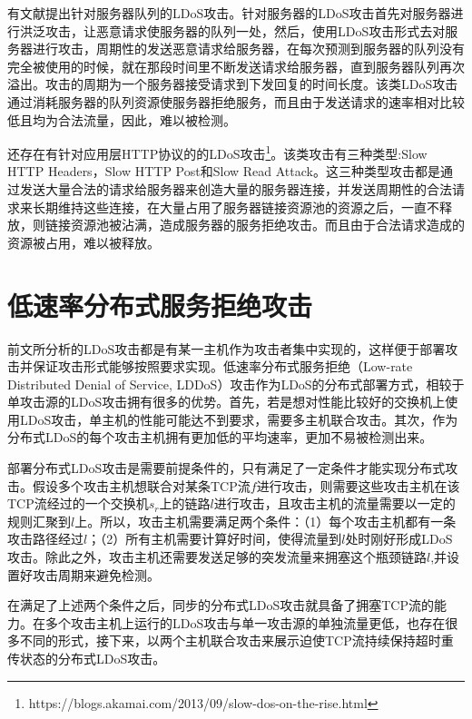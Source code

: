 有文献\cite{Maci2007Evaluation}提出针对服务器队列的LDoS攻击。针对服务器的LDoS攻击首先对服务器进行洪泛攻击，让恶意请求使服务器的队列一处，然后，使用LDoS攻击形式去对服务器进行攻击，周期性的发送恶意请求给服务器，在每次预测到服务器的队列没有完全被使用的时候，就在那段时间里不断发送请求给服务器，直到服务器队列再次溢出。攻击的周期为一个服务器接受请求到下发回复的时间长度。该类LDoS攻击通过消耗服务器的队列资源使服务器拒绝服务，而且由于发送请求的速率相对比较低且均为合法流量，因此，难以被检测。

还存在有针对应用层HTTP协议的的LDoS攻击\footnote{https://blogs.akamai.com/2013/09/slow-dos-on-the-rise.html}。该类攻击有三种类型:Slow HTTP Headers，Slow HTTP Post和Slow Read Attack。这三种类型攻击都是通过发送大量合法的请求给服务器来创造大量的服务器连接，并发送周期性的合法请求来长期维持这些连接，在大量占用了服务器链接资源池的资源之后，一直不释放，则链接资源池被沾满，造成服务器的服务拒绝攻击。而且由于合法请求造成的资源被占用，难以被释放。
\section{低速率分布式服务拒绝攻击}


前文所分析的LDoS攻击都是有某一主机作为攻击者集中实现的，这样便于部署攻击并保证攻击形式能够按照要求实现。低速率分布式服务拒绝（Low-rate Distributed Denial of Service, LDDoS）攻击作为LDoS的分布式部署方式，相较于单攻击源的LDoS攻击拥有很多的优势。首先，若是想对性能比较好的交换机上使用LDoS攻击，单主机的性能可能达不到要求，需要多主机联合攻击。其次，作为分布式LDoS的每个攻击主机拥有更加低的平均速率，更加不易被检测出来。

部署分布式LDoS攻击是需要前提条件的，只有满足了一定条件才能实现分布式攻击。假设多个攻击主机想联合对某条TCP流$f$进行攻击，则需要这些攻击主机在该TCP流经过的一个交换机$s_r$上的链路$l$进行攻击，且攻击主机的流量需要以一定的规则汇聚到$l$上。所以，攻击主机需要满足两个条件：（1）每个攻击主机都有一条攻击路径经过$l$；（2）所有主机需要计算好时间，使得流量到$l$处时刚好形成LDoS攻击。除此之外，攻击主机还需要发送足够的突发流量来拥塞这个瓶颈链路$l$,并设置好攻击周期来避免检测。

在满足了上述两个条件之后，同步的分布式LDoS攻击就具备了拥塞TCP流的能力。在多个攻击主机上运行的LDoS攻击与单一攻击源的单独流量更低，也存在很多不同的形式，接下来，以两个主机联合攻击来展示迫使TCP流持续保持超时重传状态的分布式LDoS攻击。


